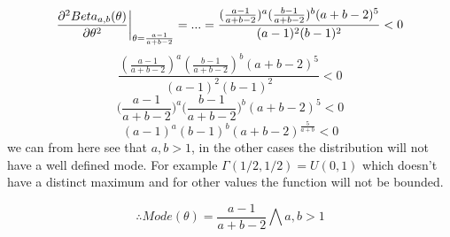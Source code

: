 \documentclass[a4paper,twoside=false,abstract=false,numbers=noenddot,
titlepage=false,headings=small,parskip=half,version=last]{scrartcl}
\begin{document}
\begin{solution}
    \begin{equation}
        {
            \frac{\partial^2{
                Beta_{a,b}(\theta)
            }}{\partial{
                \theta
            }^2}
        }\bigg|_{
            \theta=\frac{a-1}{a+b-2}
        } = ... = 
        \frac{
            (
                \frac{
                    a-1 
                }{
                    a+b-2
                }   
            )^a
            (
                \frac{
                    b-1 
                }{
                    a+b-2
                }   
            )^b
            (a+b-2)^5
        }{
            (a-1)^2(b-1)^2
        } < 0
    \end{equation}
    \begin{equation}
        \frac{
            (
                \frac{
                    a-1 
                }{
                    a+b-2
                }   
            )^a
            (
                \frac{
                    b-1 
                }{
                    a+b-2
                }   
            )^b
            (a+b-2)^5
        }{
            (a-1)^2(b-1)^2
        } < 0
    \end{equation}
    \begin{equation}
        {
            \bigg(
                \frac{
                    a-1 
                }{
                    a+b-2
                }   
            \bigg)^a
            \bigg(
                \frac{
                    b-1 
                }{
                    a+b-2
                }   
            \bigg)^b
            (a+b-2)^5
        } < 0
    \end{equation}
    \begin{equation}
        {
            (
                a-1 
            )^a
            (
                b-1 
            )^b
            (a+b-2)^\frac{5}{a+b}
        } < 0
    \end{equation}
    we can from here see that $a,b>1$, in the other cases the distribution will not have
    a well defined mode. For example $\Gamma(1/2,1/2)=U(0,1)$ which doesn't have
    a distinct maximum and for other values the function will not be bounded.

    \begin{equation}
        \therefore Mode(\theta) = \frac{a-1}{a+b-2}\bigwedge a,b>1
    \end{equation}


\end{solution}
\end{document}
